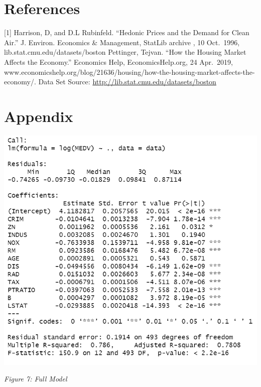 \documentclass[a4paper,9pt,twocolumn,twoside,]{pinp}
\begin{document}
\hypertarget{references}{%
\section{References}\label{references}}

{[}1{]} Harrison, D, and D.L Rubinfeld. ``Hedonic Prices and the Demand
for Clean Air.'' J. Environ. Economics \& Management, StatLib archive ,
10 Oct.~1996, lib.stat.cmu.edu/datasets/boston \newline
[2] Pettinger, Tejvan. ``How the Housing Market Affects the Economy.''
Economics Help, EconomicsHelp.org, 24 Apr.~2019,
www.economicshelp.org/blog/21636/housing/how-the-housing-market-affects-the-economy/.
\newline
[3] Data Set Source: \url{http://lib.stat.cmu.edu/datasets/boston}

\hypertarget{appendix}{%
\section{Appendix}\label{appendix}}

\begin{center}\includegraphics[width=0.95\linewidth]{full} \end{center}

\emph{Figure 7: Full Model} \newline
\end{document}
